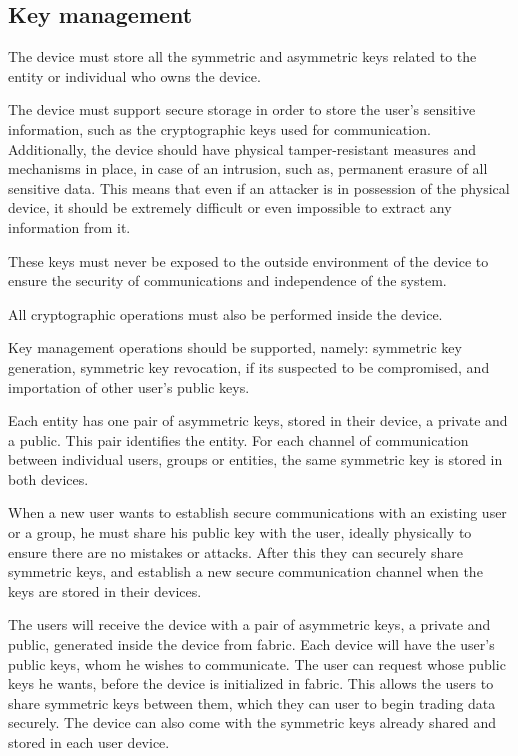 \subsection{Key management} \label{chap:problem:services:key}
The device must store all the symmetric and asymmetric keys related to the entity or individual who owns the device.

The device must support secure storage in order to store the user's sensitive information, such as the cryptographic keys used for communication.
Additionally, the device should have physical tamper-resistant measures and mechanisms in place, in case of an intrusion, such as, permanent erasure of all sensitive data. 
This means that even if an attacker is in possession of the physical device, it should be extremely difficult or even impossible to extract any information from it.

These keys must never be exposed to the outside environment of the device to ensure the security of communications and independence of the system.

All cryptographic operations must also be performed inside the device.

Key management operations should be supported, namely: symmetric key generation, symmetric key revocation, if its suspected to be compromised, and importation of other user's public keys.

Each entity has one pair of asymmetric keys, stored in their device, a private and a public. This pair identifies the entity.
For each channel of communication between individual users, groups or entities, the same symmetric key is stored in both devices.

When a new user wants to establish secure communications with an existing user or a group, he must share his public key with the user, ideally physically to ensure there are no mistakes or attacks. After this they can securely share symmetric keys, and establish a new secure communication channel when the keys are stored in their devices.

The users will receive the device with a pair of asymmetric keys, a private and public, generated inside the device from fabric. Each device will have the user's public keys, whom he wishes to communicate. The user can request whose public keys he wants, before the device is initialized in fabric. This allows the users to share symmetric keys between them, which they can user to begin trading data securely. The device can also come with the symmetric keys already shared and stored in each user device.

